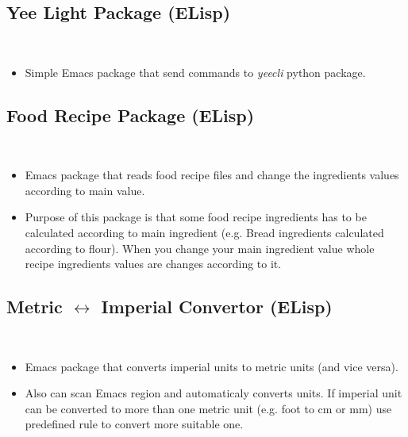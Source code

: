 \documentclass[a4paper, 9pt]{extarticle}
\begin{document}
\subsection{Yee Light Package (ELisp)} \hfill \\
\begin{itemize}
\item Simple Emacs package that send commands to \emph{yeecli} python
	package.
\end{itemize}

\subsection{Food Recipe Package (ELisp)} \hfill \\
\begin{itemize}
\item Emacs package that reads food recipe files and change the ingredients
	values according to main value.
\item Purpose of this package is that some food recipe ingredients has to be
	calculated according to main ingredient
	(e.g. Bread ingredients calculated according to flour). When you change your
	main ingredient value whole recipe ingredients values are changes according
	to it.
\end{itemize}


\subsection{Metric $\longleftrightarrow$ Imperial Convertor (ELisp)} \hfill \\
\begin{itemize}
\item Emacs package that converts imperial units to metric units
	(and vice versa).
\item Also can scan Emacs region and automaticaly converts units. If imperial
	unit can be converted to more than one metric unit (e.g. foot to cm or mm)
	use predefined rule to convert more suitable one.
\end{itemize}

\mylanguages{}
\mytechnicalskillsb{}
\mycertificates{}

\end{document}
